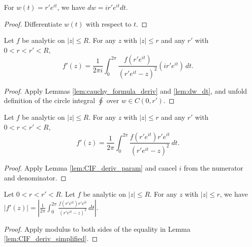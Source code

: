 

\begin{lemma}[Differential of $w(t)$] \label{lem:dw_dt} \leanok
For $w(t) = r'e^{it}$, we have $dw = ir'e^{it}dt$.
\end{lemma}
\begin{proof}\leanok
Differentiate $w(t)$ with respect to $t$.
\end{proof}


\begin{lemma} \label{lem:CIF_deriv_param} \leanok
Let $f$ be analytic on $|z| \le R$. For any $z$ with $|z| \le r$ and any $r'$ with $0 < r < r' < R$,
\[ f'(z) = \frac{1}{2\pi i} \int_{0}^{2\pi} \frac{f(r'e^{it})}{(r'e^{it}-z)^2} (ir'e^{it})\,dt. \]
\end{lemma}
\begin{proof}\leanok
{}
Apply Lemmas \ref{lem:cauchy_formula_deriv} and \ref{lem:dw_dt}, and unfold definition of the circle integral $\oint$ over $w\in C(0,r')$. \leanok
\end{proof}


\begin{lemma} \label{lem:CIF_deriv_simplified} \leanok
Let $f$ be analytic on $|z| \le R$. For any $z$ with $|z| \le r$ and any $r'$ with $0 < r < r' < R$,
\[ f'(z) = \frac{1}{2\pi} \int_{0}^{2\pi} \frac{f(r'e^{it}) r'e^{it}}{(r'e^{it}-z)^2}\, dt. \]
\end{lemma}
\begin{proof}\leanok
{}
Apply Lemma \ref{lem:CIF_deriv_param} and cancel $i$ from the numerator and denominator.
\end{proof}




\begin{lemma}\label{lem:modulus_of_f_prime0} \leanok
Let $0 < r < r' < R$. Let $f$ be analytic on $|z| \le R$. For any $z$ with $|z| \le r$, we have
$|f'(z)| = \left|\frac{1}{2\pi} \int_{0}^{2\pi} \frac{f(r'e^{it}) r'e^{it}}{(r'e^{it}-z)^2}\, dt \right|$.
\end{lemma}
\begin{proof}\leanok
{}
Apply modulus to both sides of the equality in Lemma \ref{lem:CIF_deriv_simplified}.
\end{proof}

